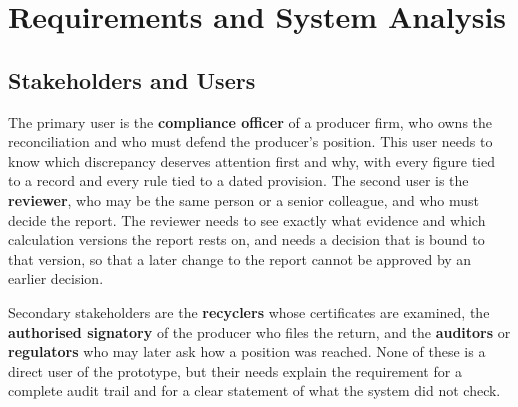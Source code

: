 \chapter{Requirements and System Analysis}
\label{ch:req}

\section{Stakeholders and Users}
The primary user is the \textbf{compliance officer} of a producer firm, who owns the reconciliation and
who must defend the producer's position. This user needs to know which discrepancy deserves attention
first and why, with every figure tied to a record and every rule tied to a dated provision.
The second user is the \textbf{reviewer}, who may be the same person or a senior colleague, and who must
decide the report. The reviewer needs to see exactly what evidence and which calculation versions the
report rests on, and needs a decision that is bound to that version, so that a later change to the report
cannot be approved by an earlier decision.

Secondary stakeholders are the \textbf{recyclers} whose certificates are examined, the \textbf{authorised
signatory} of the producer who files the return, and the \textbf{auditors} or \textbf{regulators} who may
later ask how a position was reached. None of these is a direct user of the prototype, but their needs
explain the requirement for a complete audit trail and for a clear statement of what the system did not
check.

